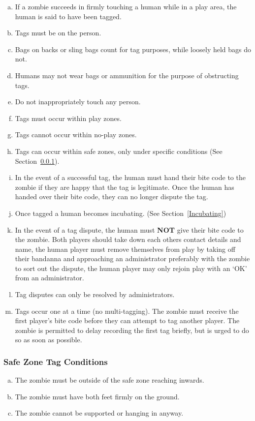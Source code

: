 \documentclass[a4paper,12pt]{article}
\begin{document}
\begin{enumerate}[(a)]
    \item If a zombie succeeds in firmly touching a human while in a  play area, the human is said to have been tagged.
    \item Tags must be on the person.
    \item Bags on backs or sling bags count for tag purposes, while loosely held bags do not.
    \item Humans may not wear bags or ammunition for the purpose of obstructing tags.
    \item Do not inappropriately touch any person.
    \item Tags must occur within play zones.
    \item Tags cannot occur within no-play zones.
    \item Tags can occur within safe zones, only under specific conditions (See Section~\ref{SafeZoneTag}). 
    \item In the event of a successful tag, the human must hand their bite code to the zombie if they are happy that the tag is legitimate. Once the human has handed over their bite code, they can no longer dispute the tag.    
    \item Once tagged a human becomes incubating. (See Section~\ref{Incubating})
    \item In the event of a tag dispute, the human must {\bf NOT} give their bite code to the zombie. Both players should take down each others contact details and name, the human player must remove themselves from play by taking off their bandanna and approaching an administrator preferably with the zombie to sort out the dispute, the human player may only rejoin play with an `OK' from an administrator.
    \item Tag disputes can only be resolved by administrators. 
    \item Tags occur one at a time (no multi-tagging). The zombie must receive the first player's bite code before they can attempt to tag another player. The zombie is permitted to delay recording the first tag briefly, but is urged to do so as soon as possible.
\end{enumerate}

\subsubsection{Safe Zone Tag Conditions}
\label{SafeZoneTag}
\begin{enumerate}[(a)]
    \item The zombie must be outside of the safe zone reaching inwards.
    \item The zombie must have both feet firmly on the ground.  
    \item The zombie cannot be supported or hanging in anyway.
\end{enumerate}
\end{document}

